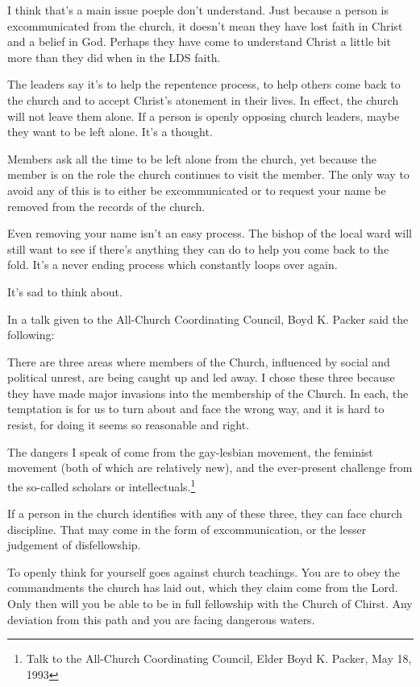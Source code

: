 I think that's a main issue poeple don't understand. Just because a person is
excommunicated from the church, it doesn't mean they have lost faith in Christ and a
belief in God. Perhaps they have come to understand Christ a little bit more than
they did when in the LDS faith.

The leaders say it's to help the repentence process, to help others come back to the
church and to accept Christ's atonement in their lives. In effect, the church will
not leave them alone. If a person is openly opposing church leaders, maybe they want
to be left alone. It's a thought.

Members ask all the time to be left alone from the church, yet because the member is
on the role the church continues to visit the member. The only way to avoid any of
this is to either be excommunicated or to request your name be removed from the
records of the church.

Even removing your name isn't an easy process. The bishop of the local ward will
still want to see if there's anything they can do to help you come back to the fold.
It's a never ending process which constantly loops over again.

It's sad to think about.

In a talk given to the All-Church Coordinating Council, Boyd K. Packer said the
following:

\begin{displayquote}
There are three areas where members of the Church, influenced by social and political 
unrest, are being caught up and led away. I chose these three because they have made 
major invasions into the membership of the Church. In each, the temptation is for us 
to turn about and face the wrong way, and it is hard to resist, for doing it seems 
so reasonable and right.

The dangers I speak of come from the gay-lesbian movement, the feminist movement 
(both of which are relatively new), and the ever-present challenge from the so-called 
scholars or intellectuals.\footnote{Talk to the All-Church Coordinating Council,
Elder Boyd K. Packer, May 18, 1993}
\end{displayquote}

If a person in the church identifies with any of these three, they can face church
discipline. That may come in the form of excommunication, or the lesser judgement of
disfellowship.

To openly think for yourself goes against church teachings. You are to obey the
commandments the church has laid out, which they claim come from the Lord. Only then
will you be able to be in full fellowship with the Church of Chirst. Any deviation
from this path and you are facing dangerous waters.

